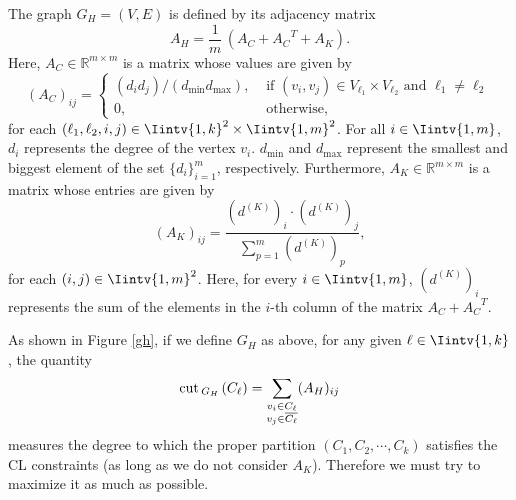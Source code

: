 \begin{definition}
The graph $G_H = (V,E)$ is defined by its adjacency matrix
   \begin{equation}\label{ah}
      A_H = \frac{1}{m} \, (A_C + {A_C}^T + A_K).
   \end{equation}
   Here, $A_C \in \mathbb{R}^{m \times m}$ is a matrix whose values are given by
   \begin{equation}
      (A_C)_{ij} = 
      \begin{cases}
      (d_i d_j)/(d_{\min} d_{\max}), & \text{ if $(v_i, v_j) \in V_{\ell_1} \times V_{\ell_2}$ and $\ell_1 \ne \ell_2$} \\
         0, & \text{ otherwise,}
      \end{cases}
   \end{equation}
   for each $(\ell_1, \ell_2, i, j) \in \Iintv{1,k}^2 \times \Iintv{1,m}^2$. 
   For all $i \in \Iintv{1,m}$, $d_i$ represents the degree of the vertex $v_i$. $d_{\min}$ and $d_{\max}$ represent the smallest and biggest element of the set $\{ d_i \}_{i=1}^m$, respectively.
   Furthermore, $A_K \in \mathbb{R}^{m \times m}$ is a matrix whose entries are given by 
   \begin{equation}
      (A_K)_{ij} = \frac{  \left( d^{(K)} \right) _i \cdot \left( d^{(K)} \right) _j }{ \sum_{p = 1}^m (d^{(K)})_p },
   \end{equation}
   for each $(i,j) \in \Iintv{1,m}^2$. Here, for every $i \in \Iintv{1,m}$, $\left( d^{(K)} \right) _i$ represents the sum of the elements in the $i$-th column of the matrix $A_C + {A_C}^T$.
\end{definition}

As shown in Figure \vref{gh}, if we define $G_H$ as above, for any given $\ell \in \Iintv{1,k}$, the quantity
\begin{equation}
   \operatorname{cut\,} _{G_H \,} (C_{\ell}) = \sum_{\substack{v_i \in C_{\ell} \\ v_j \in \overline{C_{\ell}}}} (A_H)_{ij} 
\end{equation}
measures the degree to which the proper partition $(C_1, C_2, \cdots, C_k)$ satisfies the CL constraints (as long as we do not consider $A_K$). 
Therefore we must try to maximize it as much as possible.

